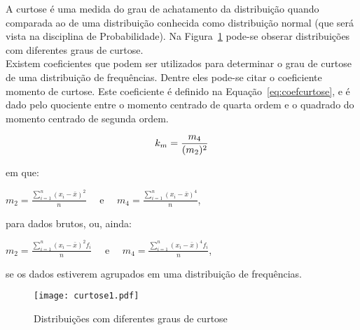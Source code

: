 \documentclass[11pt,fleqn]{book} %
\begin{document}
A curtose é uma medida do grau de achatamento da distribuição quando comparada ao de uma distribuição conhecida como distribuição normal (que será vista na disciplina de Probabilidade). Na Figura~\ref{fig:distcurtose} pode-se obserar distribuições com diferentes graus de curtose. \\

Existem coeficientes que podem ser utilizados para determinar o grau de curtose de uma distribuição de frequências. Dentre eles pode-se citar o coeficiente momento de curtose. Este coeficiente é definido na Equação~\ref{eq:coefcurtose}, e é dado pelo quociente entre o momento centrado de quarta ordem e o quadrado do momento centrado de segunda ordem. \\

\begin{eBox}
\vspace{-0.5cm}
\begin{equation} \label{eq:coefcurtose}
k_m=\frac{m_4}{(m_2)^2} \\
\end{equation}
\end{eBox}

\noindent em que:

\begin{center}
$\displaystyle m_2=\frac{\displaystyle\sum_{i=1}^{n} (x_i-\bar{x})^2}{n}$ \,\,\,\, e \,\,\,\, $\displaystyle m_4=\frac{\displaystyle\sum_{i=1}^{n} (x_i-\bar{x})^4}{n}$, \\
\end{center}

\noindent para dados brutos, ou, ainda: \\

\begin{center}
$\displaystyle m_2=\frac{\displaystyle\sum_{i=1}^{n} (x_i-\bar{x})^2 f_i}{n}$ \,\,\,\, e \,\,\,\, $\displaystyle m_4=\frac{\displaystyle\sum_{i=1}^{n} (x_i-\bar{x})^4 f_i}{n}$, \\
\end{center}

\noindent se os dados estiverem agrupados em uma distribuição de frequências. \\

\begin{figure}[h!]
\centering\texttt{[image: curtose1.pdf]}
\setlength{\abovecaptionskip}{0.5pt}
\caption{Distribuições com diferentes graus de curtose}
\label{fig:distcurtose} %
\end{figure}
\end{document}
